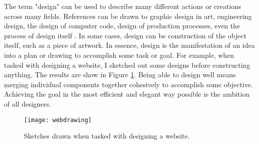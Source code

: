 

The term "design" can be used to describe many different actions or creations across many fields. References can be drawn to graphic design in art, engineering design, the design of computer code, design of production processes, even the process of design itself \cite{howdesignersthink}. In some cases, design can be construction of the object itself, such as a piece of artwork. In essence, design is the manifestation of an idea into a plan or drawing to accomplish some task or goal. For example, when tasked with designing a website, I sketched out some designs before constructing anything. The results are show in Figure \ref{fig:websitesketch}. Being able to design well means merging individual components together cohesively to accomplish some objective. Achieving the goal in the most efficient and elegant way possible is the ambition of all designers. \\

\begin{figure}[ht]
\centering
\texttt{[image: webdrawing]}
\caption[Design sketch examples drawn when tasked with designing a website.]{Sketches drawn when tasked with designing a website.}
\label{fig:websitesketch}
\end{figure}

